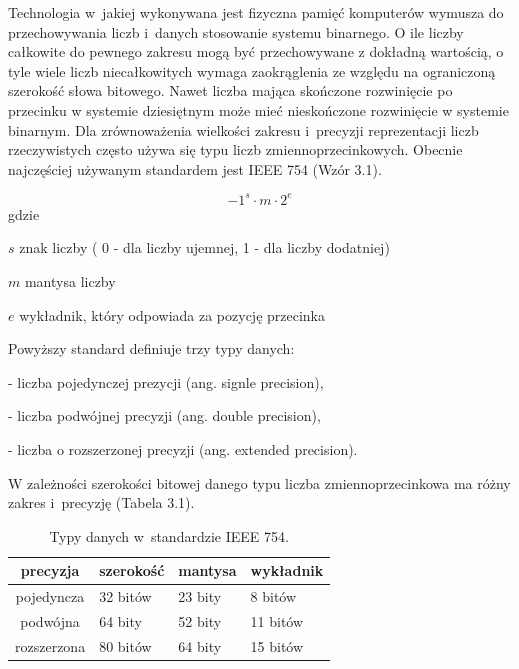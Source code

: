 Technologia w~jakiej wykonywana jest fizyczna pamięć komputerów wymusza do przechowywania liczb i~danych stosowanie systemu binarnego. O ile liczby całkowite do pewnego zakresu mogą być przechowywane z dokładną wartością, o tyle wiele liczb niecałkowitych wymaga zaokrąglenia ze względu na ograniczoną szerokość słowa bitowego. Nawet liczba mająca skończone rozwinięcie po przecinku w systemie dziesiętnym może mieć nieskończone rozwinięcie w systemie binarnym. Dla zrównoważenia wielkości zakresu i~precyzji reprezentacji liczb rzeczywistych często używa się typu liczb zmiennoprzecinkowych. Obecnie najczęściej używanym standardem jest IEEE 754 (Wzór 3.1).

\begin{equation}
-1^s\cdot m \cdot 2^e
\end{equation}
gdzie
\begin{eqwhere}[2cm]
        \item[$s$]znak liczby ( 0 - dla liczby ujemnej, 1 - dla liczby dodatniej)
        \item[$m$] mantysa liczby
        \item[$e$] wykładnik, który odpowiada za pozycję przecinka 
\end{eqwhere}

Powyższy standard definiuje trzy typy danych:

- liczba pojedynczej prezycji (ang. signle precision),

- liczba podwójnej precyzji (ang. double precision),

- liczba o rozszerzonej precyzji (ang. extended precision).

W zależności szerokości bitowej danego typu liczba zmiennoprzecinkowa ma różny zakres i~precyzję (Tabela 3.1).

\begin{table}[H]
        \centering
        \begin{threeparttable}
                \caption{Typy danych w~standardzie IEEE 754.}\label{tab:table_exampleaz}
                \begin{tabularx}{0.6\textwidth}{| c | X | X | X |}
                        \midrule
                        	precyzja	&	szerokość & mantysa & wykładnik \\
\midrule
		pojedyncza  & 32 bitów & 23 bity & 8 bitów \\
                        podwójna  & 64 bity & 52 bity & 11 bitów \\
		rozszerzona & 80 bitów & 64 bity & 15 bitów \\
                        \bottomrule
                \end{tabularx}
        \end{threeparttable}
\end{table}

